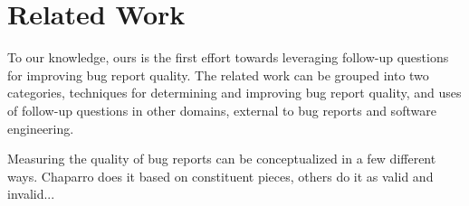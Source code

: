 \section{Related Work}

To our knowledge, ours is the first  effort towards leveraging follow-up questions for
improving bug report quality. The related work can be grouped into two categories, techniques
for determining and improving bug report quality, and uses of follow-up questions in other domains,
external to bug reports and software engineering.

Measuring the quality of bug reports can be conceptualized in a few different ways.
Chaparro does it based on constituent pieces, others do it as valid and invalid...

